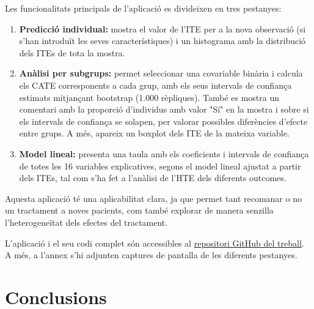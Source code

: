 \documentclass[../main.tex]{subfiles}
\begin{document}
    Les funcionalitats principals de l’aplicació es divideixen en tres pestanyes:
    \begin{enumerate}
        \item \textbf{Predicció individual:} mostra el valor de l’ITE per a la nova observació (si s’han introduït les seves característiques) i un histograma amb la distribució dels ITEs de tota la mostra.
        
        \item \textbf{Anàlisi per subgrups:} permet seleccionar una covariable binària i calcula els CATE corresponents a cada grup, amb els seus intervals de confiança estimats mitjançant bootstrap (1.000 rèpliques). També es mostra un comentari amb la proporció d’individus amb valor "Sí" en la mostra i sobre si els intervals de confiança se solapen, per valorar possibles diferències d’efecte entre grups. A més, apareix un boxplot dels ITE de la mateixa variable.
    
        \item \textbf{Model lineal:} presenta una taula amb els coeficients i intervals de confiança de totes les 16 variables explicatives, segons el model lineal ajustat a partir dels ITEs, tal com s’ha fet a l’anàlisi de l’HTE dels diferents outcomes.
    \end{enumerate}
    
    Aquesta aplicació té una aplicabilitat clara, ja que permet tant recomanar o no un tractament a noves pacients, com també explorar de manera senzilla l’heterogeneïtat dels efectes del tractament.
    
    L’aplicació i el seu codi complet són accessibles al \href{https://github.com/jordi-lr/tfg-inferencia_causal}{repositori GitHub del treball}. A més, a l’annex s’hi adjunten captures de pantalla de les diferents pestanyes.


    
    \FloatBarrier
    \section{Conclusions}\label{sec:concl_parct}
\end{document}
